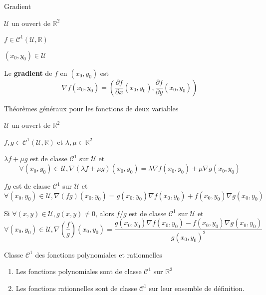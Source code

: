     \begin{defi}{Gradient}{}
        \begin{soient}
            \item $\mathcal{U}$ un ouvert de $\mathbb{R}^2$
            \item $f\in \mathcal{C}^1(\mathcal{U},\mathbb{R})$
            \item $(x_0,y_0) \in \mathcal{U}$
        \end{soient}
        Le \textbf{gradient} de $f$ en $(x_0,y_0)$ est 
        \[ \nabla f(x_0,y_0) = \left(\frac{\partial f}{\partial x}(x_0,y_0), \frac{\partial f}{\partial y}(x_0,y_0)\right) \]
    \end{defi}

    \begin{prop}{Théorèmes généraux pour les fonctions de deux variables}{}
        \begin{soient}
            \item $\mathcal{U}$ un ouvert de $\mathbb{R}^2$
            \item $f,g \in \mathcal{C}^1(\mathcal{U},\mathbb{R})$ et $\lambda,\mu \in \mathbb{R}^2$
        \end{soient}
        \begin{alors}
            \item $\lambda f + \mu g$ est de classe $\mathcal{C}^1$ sur $\mathcal{U}$ et
            \[ \forall (x_0,y_0) \in \mathcal{U}, \nabla (\lambda f + \mu g)(x_0,y_0) = \lambda \nabla f(x_0,y_0) + \mu \nabla g(x_0,y_0) \]
            \item $fg$ est de classe $\mathcal{C}^1$ sur $\mathcal{U}$ et
            \[ \forall (x_0,y_0) \in \mathcal{U}, \nabla (fg)(x_0,y_0) = g(x_0,y_0) \nabla f(x_0,y_0) + f(x_0,y_0) \nabla g(x_0,y_0) \]
            \item Si $\forall (x,y) \in \mathcal{U}, g(x,y) \neq 0$, alors $f / g$ est de classe $\mathcal{C}^1$ sur $\mathcal{U}$ et
            \[ \forall (x_0,y_0) \in \mathcal{U}, \nabla \left(\frac{f}{g}\right)(x_0,y_0) = \frac{g(x_0,y_0) \nabla f(x_0,y_0) - f(x_0,y_0) \nabla g(x_0,y_0)}{g(x_0,y_0)^2} \]
        \end{alors}
    \end{prop}

    \begin{coro}{Classe $\mathcal{C}^1$ des fonctions polynomiales et rationnelles}{}
        \begin{enumerate}
            \item Les fonctions polynomiales sont de classe $\mathcal{C}^1$ sur $\mathbb{R}^2$
            \item Les fonctions rationnelles sont de classe $\mathcal{C}^1$ sur leur ensemble de définition.
        \end{enumerate}
    \end{coro}

